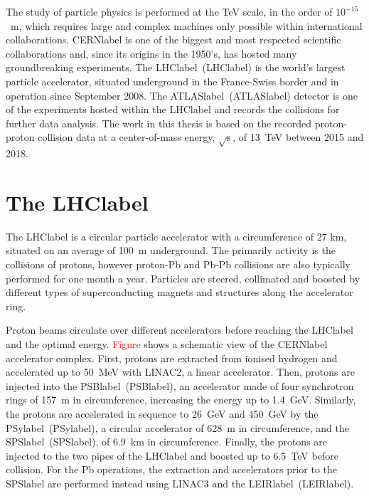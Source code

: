 The study of particle physics is performed at the TeV scale, in the order of $10^{-15}$~m, which requires large and complex machines only possible within international collaborations. \acrshort{CERNlabel} is one of the biggest and most respected scientific collaborations and, since its origins in the 1950's, has hosted many groundbreaking experiments. The \acrlong{LHClabel}~(\acrshort{LHClabel}) is the world's largest particle accelerator, situated underground in the France-Swiss border and in operation since September 2008. The \acrlong{ATLASlabel}~(\acrshort{ATLASlabel}) detector is one of the experiments hosted within the \acrshort{LHClabel} and records the collisions for further data analysis. The work in this thesis is based on the recorded proton-proton collision data at a center-of-mass energy, $\sqrt{\text{s}}$, of 13~TeV between 2015 and 2018.
\section{The \acrshort{LHClabel}}

The \acrshort{LHClabel} is a circular particle accelerator with a circumference of 27 km, situated on an average of 100~m underground. The primarily activity is the collisions of protons, however proton-Pb and Pb-Pb collisions are also typically performed for one month a year. Particles are steered, collimated and boosted by different types of superconducting magnets and structures along the accelerator ring.

Proton beams circulate over different accelerators before reaching the \acrshort{LHClabel} and the optimal energy. \textcolor{red}{Figure} shows a schematic view of the \acrshort{CERNlabel} accelerator complex. First, protons are extracted from ionised hydrogen and accelerated up to 50~MeV with LINAC2, a linear accelerator. Then, protons are injected into the \acrlong{PSBlabel}~(\acrshort{PSBlabel}), an accelerator made of four synchrotron rings of 157~m in circumference, increasing the energy up to 1.4~GeV. Similarly, the protons are accelerated in sequence to 26~GeV and 450~GeV by the \acrlong{PSylabel}~(\acrshort{PSylabel}), a circular accelerator of 628~m in circumference, and the \acrlong{SPSlabel}~(\acrshort{SPSlabel}), of 6.9~km in circumference. Finally, the protons are injected to the two pipes of the \acrshort{LHClabel} and boosted up to 6.5~TeV before collision. For the Pb operations, the extraction and accelerators prior to the \acrshort{SPSlabel} are performed instead using LINAC3 and the \acrlong{LEIRlabel}~(\acrshort{LEIRlabel}).

